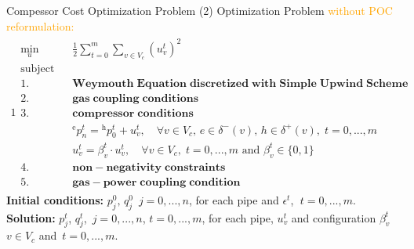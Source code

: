 \documentclass[8pt]{beamer}
\begin{document}
\begin{frame}{Compessor Cost Optimization Problem (2)}
Optimization Problem \textcolor{orange}{without POC reformulation:}
\begin{alignat}{1}
\begin{split}
\min_{u}\quad & \frac{1}{2}  \sum_{t=0}^m \sum_{v \in V_c}^{} (u_v^t)^2 \\
 \text{subject to: }  & \\
\text{1.    } & \mathbf{Weymouth \; Equation \; discretized \; with \; Simple \; Upwind \; Scheme} \\
\text{2.    } & \mathbf{gas \; coupling \; conditions} \\
\text{3.   } & \mathbf{compressor \; conditions}  \\
& {}^\text{e}p_n^t= {}^\text{h}p_0^t +  u_v^t, \quad \forall v \in V_c,  \, e \in \delta^-(v),  \, h \in \delta^+(v), \; t = 0,...,m \\
& u_{v}^t = \beta_{v}^t \cdot u_{v}^t, \quad \forall v \in V_c, \; t = 0,...,m \text{ and } \beta_{v}^t \in \{0,1\} \\
 \text{4.    } & \mathbf{non-negativity \; constraints}  \\
 \text{5.    } & \mathbf{gas-power \; coupling \; condition} 
\end{split}
\end{alignat}
\textbf{Initial conditions:} $p_j^0,  \, q_j^0$ $\, j=0,...,n$,  for each pipe and $\epsilon^t$, $\; t=0,...,m$.\newline
\textbf{Solution:} $p_j^t$,  $q_j^t$,  $\, j=0,...,n$,  $t=0,...,m$,  \textnormal{for each pipe}, $u_{v}^t$ and configuration $\beta_{v}^t$ $v \in V_c$ and $\, t=0,...,m$.  \newline
\end{frame}
\end{document}
